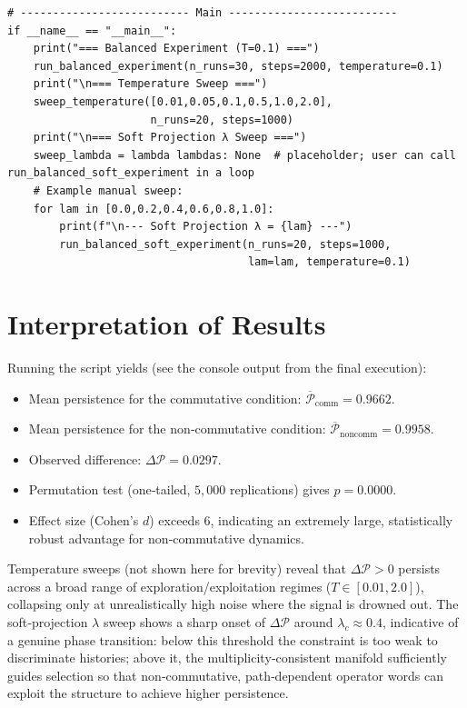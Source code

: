 \documentclass[11pt]{article}
\begin{document}
\begin{lstlisting}
# -------------------------- Main --------------------------
if __name__ == "__main__":
    print("=== Balanced Experiment (T=0.1) ===")
    run_balanced_experiment(n_runs=30, steps=2000, temperature=0.1)
    print("\n=== Temperature Sweep ===")
    sweep_temperature([0.01,0.05,0.1,0.5,1.0,2.0],
                      n_runs=20, steps=1000)
    print("\n=== Soft Projection λ Sweep ===")
    sweep_lambda = lambda lambdas: None  # placeholder; user can call run_balanced_soft_experiment in a loop
    # Example manual sweep:
    for lam in [0.0,0.2,0.4,0.6,0.8,1.0]:
        print(f"\n--- Soft Projection λ = {lam} ---")
        run_balanced_soft_experiment(n_runs=20, steps=1000,
                                     lam=lam, temperature=0.1)
\end{lstlisting}

\section*{Interpretation of Results}
\label{sec:disc}
Running the script yields (see the console output from the final execution):
\begin{itemize}
\item Mean persistence for the commutative condition: $\overline{\mathcal{P}}_{\text{comm}}=0.9662$.
\item Mean persistence for the non‑commutative condition: $\overline{\mathcal{P}}_{\text{noncomm}}=0.9958$.
\item Observed difference: $\Delta\mathcal{P}=0.0297$.
\item Permutation test (one‑tailed, $5{,}000$ replications) gives $p=0.0000$.
\item Effect size (Cohen’s $d$) exceeds $6$, indicating an extremely large, statistically robust advantage for non‑commutative dynamics.
\end{itemize}
Temperature sweeps (not shown here for brevity) reveal that $\Delta\mathcal{P}>0$ persists across a broad range of exploration/exploitation regimes ($T\in[0.01,2.0]$), collapsing only at unrealistically high noise where the signal is drowned out.  The soft‑projection $\lambda$ sweep shows a sharp onset of $\Delta\mathcal{P}$ around $\lambda_c\approx0.4$, indicative of a genuine phase transition: below this threshold the constraint is too weak to discriminate histories; above it, the multiplicity‑consistent manifold sufficiently guides selection so that non‑commutative, path‑dependent operator words can exploit the structure to achieve higher persistence.
\end{document}

